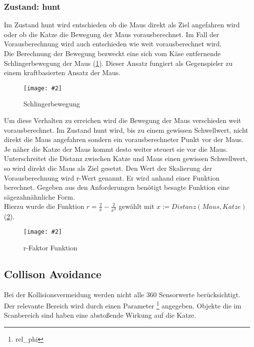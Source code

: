 \documentclass[
a4paper,     %
12pt         %
]{scrartcl}  %
\newcommand{\mygraphics}[3]{
\begin{figure}[!h]
  \begin{center}
    \texttt{[image: \#2]} \\
    \caption{#3}\label{fig:#2}
  \end{center}
\end{figure}

}
\begin{document}
\subsubsection{Zustand: \glqq hunt\grqq{}}
\label{hunt}
Im Zustand \glqq hunt\grqq{} wird entschieden ob die Maus direkt als Ziel angefahren wird oder ob die Katze die Bewegung der Maus vorausberechnet. Im Fall der Vorausberechnung wird auch entschieden wie weit vorausberechnet wird.\\
Die Berechnung der Bewegung bezweckt eine sich vom Käse entfernende Schlingerbewegung der Maus (\ref{fig:ziel.png}).
Dieser Ansatz fungiert als Gegenspieler zu einem kraftbasierten Ansatz der Maus.
\mygraphics{0.6\textwidth}{ziel.png}{Schlingerbewegung}
\noindent Um diese Verhalten zu erreichen wird die Bewegung der Maus verschieden weit vorausberechnet.
Im Zustand  hunt \grqq{} wird, bis zu einem gewissen Schwellwert, nicht direkt die Maus angefahren sondern ein vorausberechneter Punkt vor der Maus. Je näher die Katze der Maus kommt desto weiter steuert sie vor die Maus. Unterschreitet die Distanz zwischen Katze und Maus einen gewissen Schwellwert, so wird direkt die Maus als Ziel gesetzt.
\clearpage
\noindent Den Wert der Skalierung der Vorausberechnung wird r-Wert genannt. Er wird anhand einer Funktion berechnet.
Gegeben aus den Anforderungen benötigt besagte Funktion eine sägezahnähnliche Form.\\
Hierzu wurde die Funktion $r= \frac{2}{x} - \frac{2}{x^3}$
gewählt mit $x := Distanz(Maus,Katze)$  (\ref{fig:huntFunction.png}).
\mygraphics{0.9\textwidth}{huntFunction.png}{r-Faktor Funktion}
\clearpage
\subsection{Collison Avoidance}
Bei der Kollisionsvermeidung werden nicht alle 360 Sensorwerte berücksichtigt. Der relevante Bereich wird durch einen Parameter \footnote {rel\_phi} angegeben. Objekte die im Scanbereich sind haben eine abstoßende Wirkung auf die Katze.
\end{document}
